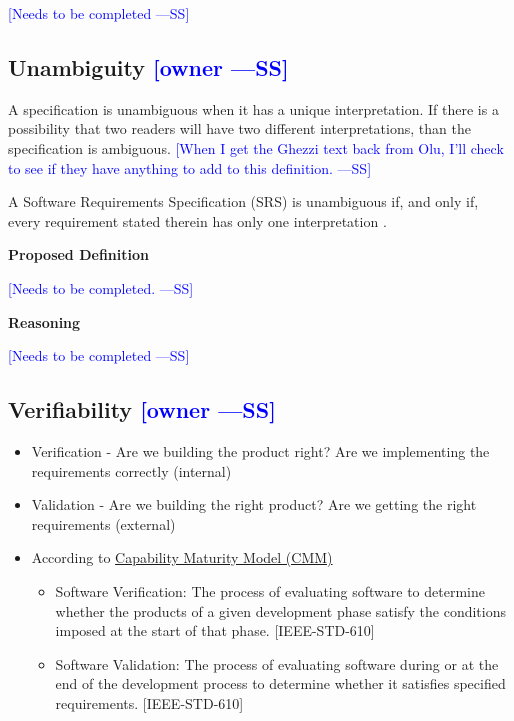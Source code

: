 \documentclass[letterpaper,cleveref]{lipics-v2019}
\newcommand{\authornote}[3]{\textcolor{#1}{[#3 ---#2]}}
\newcommand{\authornote}[3]{}
\newcommand{\wss}[1]{\authornote{blue}{SS}{#1}} %
\theoremstyle{definition}
\begin{document}
\wss{Needs to be completed}

\subsection{Unambiguity \wss{owner}}

A specification is unambiguous when it has a unique interpretation.  If there is
a possibility that two readers will have two different interpretations, than the
specification is ambiguous.  \wss{When I get the Ghezzi text back from Olu, I'll
  check to see if they have anything to add to this definition.}

A Software Requirements Specification (SRS) is unambiguous if, and only if,
every requirement stated therein has only one interpretation \citep{IEEE1998}.

\noindent \textbf{Proposed Definition} 

\wss{Needs to be completed.}

\noindent \textbf{Reasoning}

\wss{Needs to be completed}

\subsection{Verifiability \wss{owner}}

\begin{itemize}

\item Verification - Are we building the product right?  Are we implementing the
  requirements correctly (internal)
\item Validation - Are we building the right product? Are we getting the right
  requirements (external)
\item According to
  \href{https://en.wikipedia.org/wiki/Software_verification_and_validation}{Capability
    Maturity Model (CMM)}
\begin{itemize}
\item 
    Software Verification: The process of evaluating software to determine
    whether the products of a given development phase satisfy the conditions
    imposed at the start of that phase. [IEEE-STD-610]
  \item Software Validation: The process of evaluating software during or at the
    end of the development process to determine whether it satisfies specified
    requirements. [IEEE-STD-610] 
\end{itemize}
\end{itemize}
\end{document}
